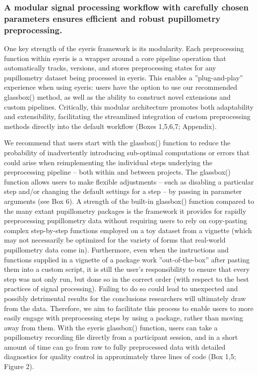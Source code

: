\subsubsection{A modular signal processing workflow with carefully chosen parameters ensures efficient and robust pupillometry preprocessing.}

One key strength of the eyeris framework is its modularity. Each preprocessing function within eyeris is a wrapper around a core pipeline operation that automatically tracks, versions, and stores preprocessing states for any pupillometry dataset being processed in eyeris. This enables a ”plug-and-play” experience when using eyeris: users have the option to use our recommended glassbox() method, as well as the ability to construct novel extensions and custom pipelines. Critically, this modular architecture promotes both adaptability and extensibility, facilitating the streamlined integration of custom preprocessing methods directly into the default workflow (Boxes 1,5,6,7; Appendix).

We recommend that users start with the glassbox() function to reduce the probability of inadvertently introducing sub-optimal computations or errors that could arise when reimplementing the individual steps underlying the preprocessing pipeline – both within and between projects. The glassbox() function allows users to make flexible adjustments – such as disabling a particular step and/or changing the default settings for a step – by passing in parameter arguments (see Box 6). A strength of the built-in glassbox() function compared to the many extant pupillometry packages is the framework it provides for rapidly preprocessing pupillometry data without requiring users to rely on copy-pasting complex step-by-step functions employed on a toy dataset from a vignette (which may not necessarily be optimized for the variety of forms that real-world pupillometry data come in). Furthermore, even when the instructions and functions supplied in a vignette of a package work ”out-of-the-box” after pasting them into a custom script, it is still the user’s responsibility to ensure that every step was not only run, but done so in the correct order (with respect to the best practices of signal processing). Failing to do so could lead to unexpected and possibly detrimental results for the conclusions researchers will ultimately draw from the data. Therefore, we aim to facilitate this process to enable users to more easily engage with preprocessing steps by using a package, rather than moving away from them. With the eyeris glassbox() function, users can take a pupillometry recording file directly from a participant session, and in a short amount of time can go from raw to fully preprocessed data with detailed diagnostics for quality control in approximately three lines of code (Box 1,5; Figure 2).

